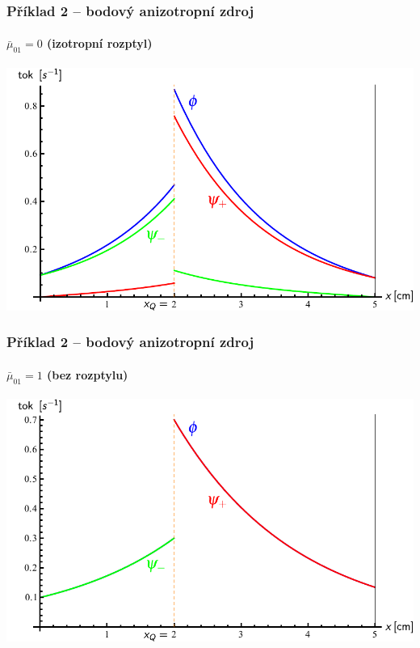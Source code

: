 \begin{frame}
  \frametitle{Příklad 2 -- bodový anizotropní zdroj}
  \framesubtitle{$\bar\mu_{01} = 0$ (izotropní rozptyl)}
  
  \centering\includegraphics[height=.75\paperheight]{obr/doleva_doprava/bodovy_0}

\end{frame}

\begin{frame}
  \frametitle{Příklad 2 -- bodový anizotropní zdroj}
  \framesubtitle{$\bar\mu_{01} = 1$ (bez rozptylu)}
  
  \centering\includegraphics[height=.75\paperheight]{obr/doleva_doprava/bodovy_1}

\end{frame}

%
%
%
%
%
